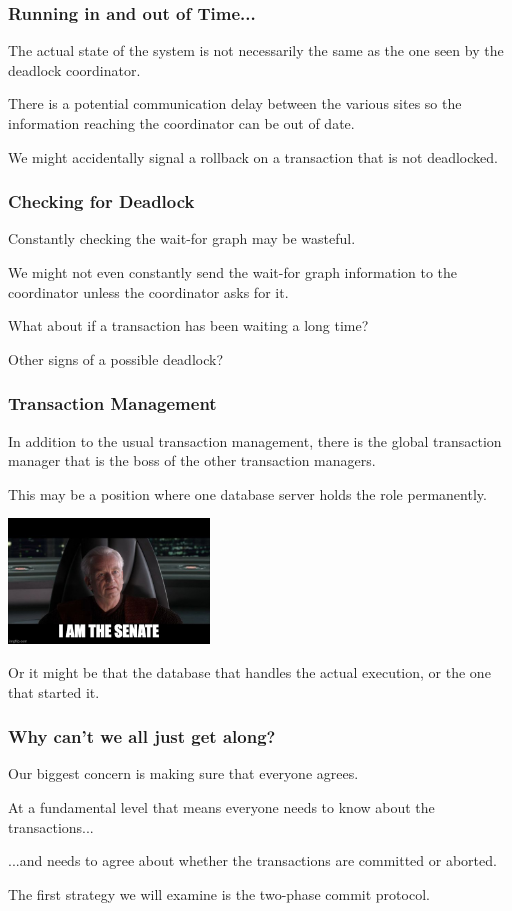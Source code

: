 \begin{frame}
\frametitle{Running in and out of Time...}

The actual state of the system is not necessarily the same as the one seen by the deadlock coordinator. 

There is a potential communication delay between the various sites so the information reaching the coordinator can be out of date.

We might accidentally signal a rollback on a transaction that is not deadlocked.


\end{frame}

\begin{frame}
\frametitle{Checking for Deadlock}

Constantly checking the wait-for graph may be wasteful.

We might not even constantly send the wait-for graph information to the coordinator unless the coordinator asks for it.

What about if a transaction has been waiting a long time?

Other signs of a possible deadlock?

\end{frame}

\begin{frame}
\frametitle{Transaction Management}

In addition to the usual transaction management, there is the global transaction manager that is the boss of the other transaction managers. 

This may be a position where one database server holds the role permanently.

\begin{center}
	\includegraphics[width=0.4\textwidth]{images/senate.jpg}
\end{center}

Or it might be that the database that handles the actual execution, or the one that started it.

\end{frame}

\begin{frame}
\frametitle{Why can't we all just get along?}

Our biggest concern is making sure that everyone agrees. 

At a fundamental level that means everyone needs to know about the transactions...

...and needs to agree about whether the transactions are committed or aborted. 

The first strategy we will examine is the two-phase commit protocol.

\end{frame}


